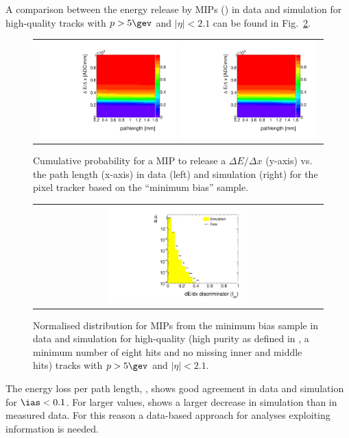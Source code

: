 A comparison between the energy release by MIPs (\ias) in data and simulation for high-quality tracks with $p>5\gev$ and $|\eta|<2.1$ can be found in Fig.~\ref{fig:Data-MC-Dedx_MIPs}.
\begin{figure}[!b]
  \centering 
  \begin{tabular}{c}
    \includegraphics[width=0.49\textwidth]{figures/analysis_2/PixelCalibration/Discriminator_template_data_pixel_2012.pdf}
    \includegraphics[width=0.49\textwidth]{figures/analysis_2/PixelCalibration/Discriminator_template_mc_pixel_2012.pdf}
  \end{tabular}
  \caption{Cumulative probability for a MIP to release a $\Delta E/ \Delta x$ (y-axis) vs. the path length (x-axis) in data (left) and simulation (right) for the pixel tracker based on the ``minimum bias'' sample.}
  \label{fig:ProbabilityTemplate}
\end{figure}
\begin{figure}[!bt]
  \centering 
  \begin{tabular}{c}
    \includegraphics[width=0.49\textwidth]{figures/analysis_2/PixelCalibration/htrackASmiSmallRange_log_MIPs.pdf}
  \end{tabular}
  \caption{Normalised \ias distribution for MIPs from the minimum bias sample in data and simulation for high-quality (high purity as defined in \cite{bib:CMS:Tracking_2010}, a minimum number of eight hits and no missing inner and middle hits) tracks with $p>5\gev$ and $|\eta|<2.1$.}
  \label{fig:Data-MC-Dedx_MIPs}
\end{figure}
The energy loss per path length, \dedx, shows good agreement in data and simulation for $\ias<0.1$.
For larger values, \ias shows a larger decrease in simulation than in measured data.
For this reason a data-based approach for analyses exploiting \dedx information is needed.\\

